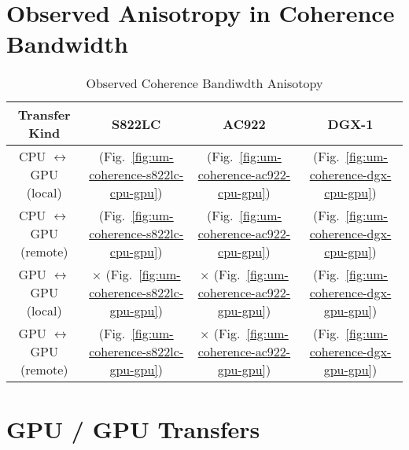 \section{Observed Anisotropy in Coherence Bandwidth}

\begin{table}[ht]
	\centering
	\caption[]{Observed Coherence Bandiwdth Anisotopy}
	\label{tab:um-prefetch-affinity}
	\begin{tabular}{|c|c|c|c|}
		\hline
		\textbf{Transfer Kind}             & \textbf{S822LC}                                         & \textbf{AC922}                                         & \textbf{DGX-1}                            \\ \hline 
		CPU $\leftrightarrow$ GPU (local)  & \checkmark (Fig.~\ref{fig:um-coherence-s822lc-cpu-gpu}) & \checkmark (Fig.~\ref{fig:um-coherence-ac922-cpu-gpu}) & (Fig.~\ref{fig:um-coherence-dgx-cpu-gpu}) \\ \hline
		CPU $\leftrightarrow$ GPU (remote) & \checkmark (Fig.~\ref{fig:um-coherence-s822lc-cpu-gpu}) & \checkmark (Fig.~\ref{fig:um-coherence-ac922-cpu-gpu}) & (Fig.~\ref{fig:um-coherence-dgx-cpu-gpu}) \\ \hline
		GPU $\leftrightarrow$ GPU (local)  & $\times$   (Fig.~\ref{fig:um-coherence-s822lc-gpu-gpu}) & $\times$   (Fig.~\ref{fig:um-coherence-ac922-gpu-gpu}) & (Fig.~\ref{fig:um-coherence-dgx-gpu-gpu}) \\ \hline
		GPU $\leftrightarrow$ GPU (remote) & \checkmark (Fig.~\ref{fig:um-coherence-s822lc-gpu-gpu}) & $\times$   (Fig.~\ref{fig:um-coherence-ac922-gpu-gpu}) & (Fig.~\ref{fig:um-coherence-dgx-gpu-gpu}) \\ \hline
	\end{tabular}
\end{table}



\section{GPU / GPU Transfers}
\label{sec:um-gpu-gpu}

